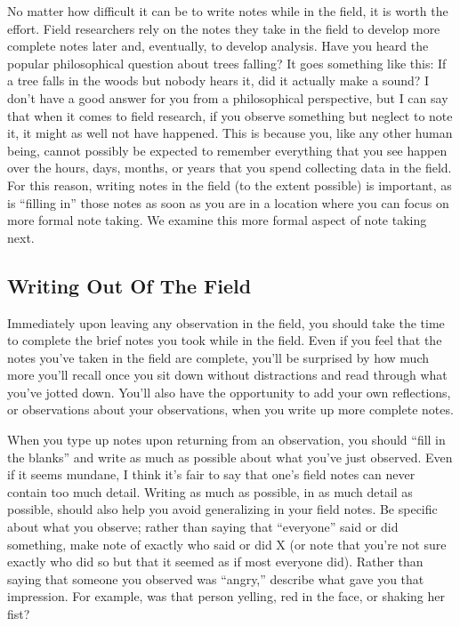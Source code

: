 No matter how difficult it can be to write notes while in the field, it is worth the effort. Field researchers rely on the notes they take in the field to develop more complete notes later and, eventually, to develop analysis. Have you heard the popular philosophical question about trees falling? It goes something like this: If a tree falls in the woods but nobody hears it, did it actually make a sound? I don’t have a good answer for you from a philosophical perspective, but I can say that when it comes to field research, if you observe something but neglect to note it, it might as well not have happened. This is because you, like any other human being, cannot possibly be expected to remember everything that you see happen over the hours, days, months, or years that you spend collecting data in the field. For this reason, writing notes in the field (to the extent possible) is important, as is ``filling in'' those notes as soon as you are in a location where you can focus on more formal note taking. We examine this more formal aspect of note taking next.

\subsection{Writing Out Of The Field}

Immediately upon leaving any observation in the field, you should take the time to complete the brief notes you took while in the field. Even if you feel that the notes you’ve taken in the field are complete, you’ll be surprised by how much more you’ll recall once you sit down without distractions and read through what you’ve jotted down. You’ll also have the opportunity to add your own reflections, or observations about your observations, when you write up more complete notes.

When you type up notes upon returning from an observation, you should ``fill in the blanks'' and write as much as possible about what you’ve just observed. Even if it seems mundane, I think it’s fair to say that one’s field notes can never contain too much detail. Writing as much as possible, in as much detail as possible, should also help you avoid generalizing in your field notes. Be specific about what you observe; rather than saying that ``everyone'' said or did something, make note of exactly who said or did X (or note that you’re not sure exactly who did so but that it seemed as if most everyone did). Rather than saying that someone you observed was ``angry,'' describe what gave you that impression. For example, was that person yelling, red in the face, or shaking her fist?

